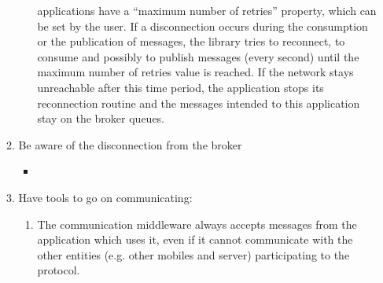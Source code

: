 \begin{enumerate}
\begin{enumerate}
\begin{itemize}
{applications have a ``maximum number of retries'' property, which can be set by
the user. If a disconnection occurs during the consumption or the publication 
of messages, 
the library tries to reconnect, to consume and possibly to publish messages 
(every second) until the maximum number of retries value is reached. If the 
network stays 
unreachable after this time period, the application stops its reconnection 
routine and the messages intended to this application stay on the broker 
queues.}
\end{itemize}
\item Be aware of the disconnection from the broker
\label{R_3_b}
\begin{itemize}
\item \postponed
\end{itemize}
\item Have tools to go on communicating:
\label{R_3_c}
\begin{enumerate}
\item The communication middleware always accepts messages from the
  application which uses it, even if it cannot communicate with the
  other entities (e.g. other mobiles and server) participating to the
  protocol.


\end{enumerate}
\end{enumerate}
\end{enumerate}
